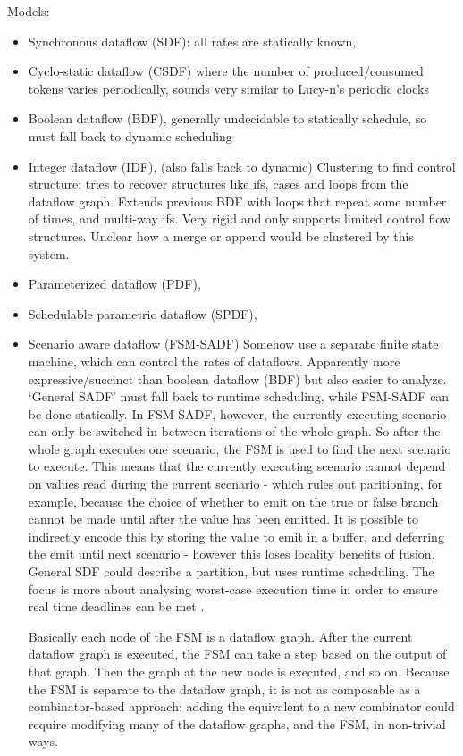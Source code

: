 Models:
\begin{itemize}
\item Synchronous dataflow (SDF):
all rates are statically known,
\item Cyclo-static dataflow (CSDF) where the number of produced/consumed tokens varies periodically, sounds very similar to Lucy-n's periodic clocks \cite{mandel2010lucy}
\item Boolean dataflow (BDF), generally undecidable to statically schedule, so must fall back to dynamic scheduling \cite{buck1993scheduling}
\item Integer dataflow (IDF), (also falls back to dynamic) \cite{buck1994static}
Clustering to find control structure: tries to recover structures like ifs, cases and loops from the dataflow graph.
Extends previous BDF \cite{buck1993scheduling} with loops that repeat some number of times, and multi-way ifs.
Very rigid and only supports limited control flow structures.
Unclear how a merge or append would be clustered by this system.
\item Parameterized dataflow (PDF),  \cite{bhattacharya2001parameterized}
\item Schedulable parametric dataflow (SPDF),  \cite{fradet2012spdf}
\item Scenario aware dataflow (FSM-SADF) \cite{stuijk2011scenario}
Somehow use a separate finite state machine, which can control the rates of dataflows.
Apparently more expressive/succinct than boolean dataflow (BDF) but also easier to analyze.
`General SADF' must fall back to runtime scheduling, while FSM-SADF can be done statically.
In FSM-SADF, however, the currently executing scenario can only be switched in between iterations of the whole graph.
So after the whole graph executes one scenario, the FSM is used to find the next scenario to execute.
This means that the currently executing scenario cannot depend on values read during the current scenario - which rules out paritioning, for example, because the choice of whether to emit on the true or false branch cannot be made until after the value has been emitted.
It is possible to indirectly encode this by storing the value to emit in a buffer, and deferring the emit until next scenario - however this loses locality benefits of fusion.
General SDF could describe a partition, but uses runtime scheduling.
The focus is more about analysing worst-case execution time in order to ensure real time deadlines can be met \cite{van2015scenario}.

Basically each node of the FSM is a dataflow graph. After the current dataflow graph is executed, the FSM can take a step based on the output of that graph. Then the graph at the new node is executed, and so on.
Because the FSM is separate to the dataflow graph, it is not as composable as a combinator-based approach: adding the equivalent to a new combinator could require modifying many of the dataflow graphs, and the FSM, in non-trivial ways.
\end{itemize}

